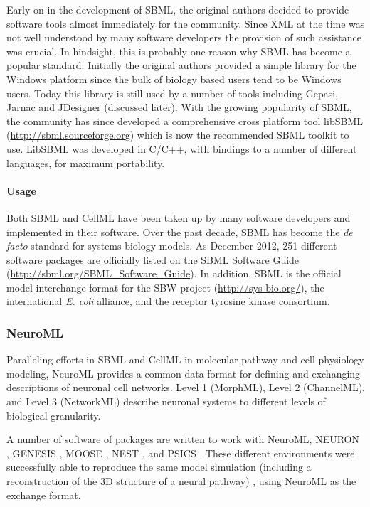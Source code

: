 Early on in the development of SBML, the original authors decided to
provide software tools almost immediately for the community. Since XML
at the time was not well understood by many software developers the
provision of such assistance was crucial. In hindsight, this is probably
one reason why SBML has become a popular standard. Initially the
original authors provided a simple library for the Windows platform
since the bulk of biology based users tend to be Windows users. Today
this library is still used by a number of tools including Gepasi, Jarnac
and JDesigner (discussed later). With the growing popularity of SBML,
the community has since developed a comprehensive cross platform tool
libSBML (\url{http://sbml.sourceforge.org}) which is now the recommended
SBML toolkit to use. LibSBML was developed in C/C++, with bindings to a
number of different languages, for maximum portability.

\paragraph{Usage}

Both SBML and CellML have been taken up by many software developers and
implemented in their software. Over the past decade, SBML has become the
\emph{de facto} standard for systems biology models. As December 2012,
251 different software packages are officially listed on the SBML
Software Guide (\url{http://sbml.org/SBML_Software_Guide}). In addition,
SBML is the official model interchange format for the SBW project
(\url{http://sys-bio.org/}), the international \emph{E. coli} alliance,
and the receptor tyrosine kinase consortium.

\subsubsection{NeuroML}

Paralleling efforts in SBML and CellML in molecular pathway and cell
physiology modeling, NeuroML \autocite{goddard:2001} provides a common
data format for defining and exchanging descriptions of neuronal cell
networks. Level 1 (MorphML), Level 2 (ChannelML), and Level 3
(NetworkML) describe neuronal systems to different levels of biological
granularity.

A number of software of packages are written to work with NeuroML,
NEURON \autocite{carnevale2006neuron}, GENESIS \autocite{bower1995book},
MOOSE \autocite{ray2008pymoose}, NEST \autocite{diesmann2001nest}, and
PSICS \autocite{cannon2010stochastic}. These different environments were
successfully able to reproduce the same model simulation (including a
reconstruction of the 3D structure of a neural pathway)
\autocite{gleeson2010}, using NeuroML as the exchange format.

